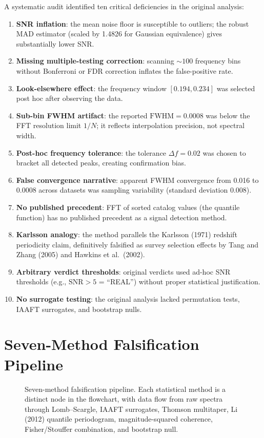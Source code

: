 \documentclass[12pt,openany]{report}
\theoremstyle{definition}
\theoremstyle{plain}
\theoremstyle{remark}
\begin{document}
A systematic audit identified ten critical deficiencies in the original
analysis:
\begin{enumerate}
  \item \textbf{SNR inflation}: the mean noise floor is susceptible to
    outliers; the robust MAD estimator (scaled by 1.4826 for Gaussian
    equivalence) gives substantially lower SNR.
  \item \textbf{Missing multiple-testing correction}: scanning
    ${\sim}100$ frequency bins without Bonferroni or FDR correction
    inflates the false-positive rate.
  \item \textbf{Look-elsewhere effect}: the frequency window
    $[0.194, 0.234]$ was selected post hoc after observing the data.
  \item \textbf{Sub-bin FWHM artifact}: the reported
    $\mathrm{FWHM} = 0.0008$ was below the FFT resolution limit $1/N$;
    it reflects interpolation precision, not spectral width.
  \item \textbf{Post-hoc frequency tolerance}: the tolerance
    $\Delta f = 0.02$ was chosen to bracket all detected peaks,
    creating confirmation bias.
  \item \textbf{False convergence narrative}: apparent FWHM convergence
    from 0.016 to 0.0008 across datasets was sampling variability
    (standard deviation 0.008).
  \item \textbf{No published precedent}: FFT of sorted catalog values
    (the quantile function) has no published precedent as a signal
    detection method.
  \item \textbf{Karlsson analogy}: the method parallels the
    Karlsson (1971) redshift periodicity claim, definitively
    falsified as survey selection effects by Tang and Zhang (2005)
    and Hawkins et al.\ (2002).
  \item \textbf{Arbitrary verdict thresholds}: original verdicts used
    ad-hoc SNR thresholds (e.g., $\mathrm{SNR} > 5$ = ``REAL'')
    without proper statistical justification.
  \item \textbf{No surrogate testing}: the original analysis lacked
    permutation tests, IAAFT surrogates, and bootstrap nulls.
\end{enumerate}

\section{Seven-Method Falsification Pipeline}

\begin{figure}[htbp]
\centering

\caption{Seven-method falsification pipeline.  Each statistical method
is a distinct node in the flowchart, with data flow from raw spectra
through Lomb--Scargle, IAAFT surrogates, Thomson multitaper, Li (2012)
quantile periodogram, magnitude-squared coherence, Fisher/Stouffer
combination, and bootstrap null.}
\label{fig:falsification-pipeline}
\end{figure}
\end{document}
